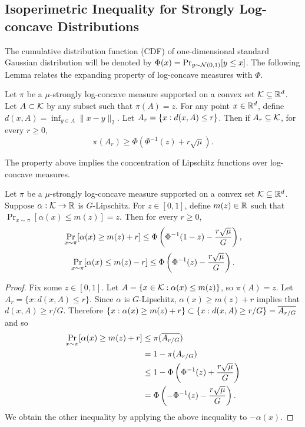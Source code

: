 \subsection{Isoperimetric Inequality for Strongly Log-concave Distributions}
The cumulative distribution function (CDF) of one-dimensional standard Gaussian distribution will be denoted by $\Phi(x)=\Pr_{y\sim\mathcal N(0,1)}[y\le x]$. The following Lemma relates the expanding property of log-concave measures with $\Phi$.
\begin{proposition}
\label{prop:isoperimetry}
Let $\pi$ be a $\mu$-strongly log-concave measure supported on a convex set $\mathcal K \subseteq \mathbb{R}^d$. Let $A\subset\mathcal K$ by any subset such that $\pi(A)=z$. For any point $x\in\mathbb{R}^d$, define $d(x,A)=\inf_{y\in A}\|x-y\|_2$. Let $A_r = \left\{ x: d(x,A)\le r\right\}$. Then if $A_r\subseteq\mathcal K$, for every $r\ge 0$, $$\pi(A_r) \ge \Phi(\Phi^{-1}(z)+r\sqrt{\mu}).$$
\end{proposition}
The property above implies the concentration of Lipschitz functions over log-concave measures.
\begin{corollary}
\label{cor:isoperimetry_lip}
Let $\pi$ be a $\mu$-strongly log-concave measure supported on a convex set $\mathcal K\subseteq\mathbb{R}^d$. Suppose $\alpha:\mathcal K\to \mathbb{R}$ is $G$-Lipschitz. For $z\in [0,1]$, define $m(z)\in \mathbb{R}$ such that $\Pr_{x\sim \pi}[\alpha(x)\le m(z)]=z$. Then for every $r\ge 0$,
$$\Pr_{x\sim \pi}[\alpha(x) \ge m(z)+r] \le \Phi\left( \Phi^{-1}(1-z)-\frac{r\sqrt{\mu}}{G}\right),$$
$$\Pr_{x\sim \pi}[\alpha(x) \le m(z)-r] \le \Phi\left( \Phi^{-1}(z)-\frac{r\sqrt{\mu}}{G}\right).$$
\end{corollary}
\begin{proof}
Fix some $z\in [0,1]$. Let $A=\{x\in \mathcal K:\alpha(x)\le m(z)\}$, so $\pi(A)=z$. Let $A_r=\{x:d(x,A)\le r\}.$ Since $\alpha$ is $G$-Lipschitz, $\alpha(x)\ge m(z)+r$ implies that $d(x,A)\ge r/G.$ Therefore $\left\{ x: \alpha(x) \ge m(z)+r\right\} \subset \left\{ x: d(x,A) \ge r/G\right\} = \overline{A_{r/G}}$ and so 
\begin{align*}
\Pr_{x\sim \pi}[\alpha(x) \ge m(z)+r] &\le \pi(\overline{A_{r/G}}) \\
&= 1- \pi(A_{r/G})\\
&\le 1 - \Phi\left(\Phi^{-1}(z)+\frac{r\sqrt{\mu}}{G}\right)\\
&= \Phi\left(-\Phi^{-1}(z)-\frac{r\sqrt{\mu}}{G}\right).
\end{align*}
We obtain the other inequality by applying the above inequality to $-\alpha(x).$
\end{proof}





